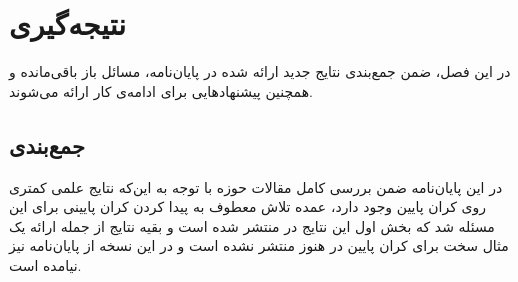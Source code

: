 \chapter{نتیجه‌گیری}
در این فصل، ضمن جمع‌بندی نتایج جدید ارائه شده در پایان‌نامه، مسائل باز باقی‌مانده و همچنین پیشنهادهایی برای ادامه‌ی کار ارائه می‌شوند.

\section{جمع‌بندی}
در این پایان‌نامه ضمن بررسی کامل مقالات حوزه
\picod
با توجه به این‌که نتایج علمی کمتری روی کران پایین وجود دارد، عمده تلاش معطوف به پیدا کردن کران پایینی برای این مسئله شد که بخش اول این نتایج در
\cite{ourwork}
منتشر شده است و بقیه نتایج از جمله ارائه یک مثال سخت برای کران پایین در \picod هنوز منتشر نشده است و در این نسخه از پایان‌نامه نیز نیامده است.
